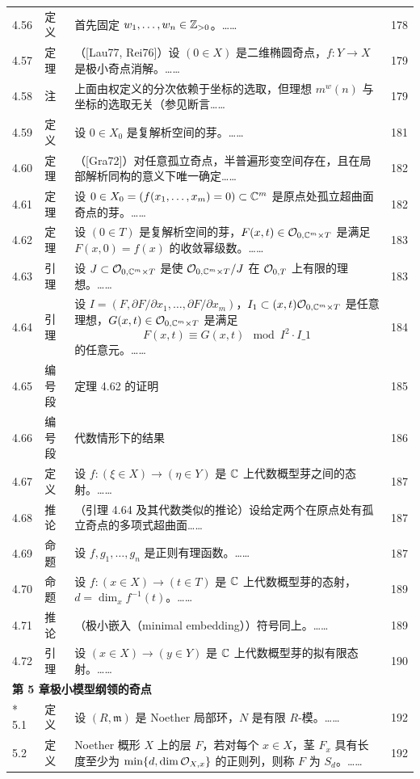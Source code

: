 \begin{longtable}{@{}p{}p{}p{}p{}@{}}
4.56 & 定义 & 首先固定 $w_1,\dots,w_n\in\mathbb{Z}_{>0}$。…… & 178 \\
4.57 & 定理 & （[Lau77, Rei76]）设 $(0\in X)$ 是二维椭圆奇点，$f:Y\to X$ 是极小奇点消解。…… & 179 \\
4.58 & 注 & 上面由权定义的分次依赖于坐标的选取，但理想 $m^w(n)$ 与坐标的选取无关（参见断言…… & 179 \\
4.59 & 定义 & 设 $0\in X_0$ 是复解析空间的芽。…… & 181 \\
4.60 & 定理 & （[Gra72]）对任意孤立奇点，半普遍形变空间存在，且在局部解析同构的意义下唯一确定…… & 182 \\
4.61 & 定理 & 设 $0\in X_0=(f(x_1,\dots,x_m)=0)\subset\mathbb{C}^m$ 是原点处孤立超曲面奇点的芽。…… & 182 \\
4.62 & 定理 & 设 $(0\in T)$ 是复解析空间的芽，$F(x,t)\in\mathcal{O}_{0,\mathbb{C}^m\times T}$ 是满足 $F(x,0)=f(x)$ 的收敛幂级数。…… & 183 \\
4.63 & 引理 & 设 $J\subset\mathcal{O}_{0,\mathbb{C}^m\times T}$ 是使 $\mathcal{O}_{0,\mathbb{C}^m\times T}/J$ 在 $\mathcal{O}_{0,T}$ 上有限的理想。…… & 183 \\
4.64 & 引理 & 设 $I=(F,\partial F/\partial x_1,\dots,\partial F/\partial x_m)$，$I_1\subset(x,t)\mathcal{O}_{0,\mathbb{C}^m\times T}$ 是任意理想，$G(x,t)\in\mathcal{O}_{0,\mathbb{C}^m\times T}$ 是满足 \[ F(x,t)\equiv G(x,t)\mod I^2\cdot I\_1 \] 的任意元。…… & 184 \\
4.65 & 编号段 & 定理 4.62 的证明 & 185 \\
4.66 & 编号段 & 代数情形下的结果 & 186 \\
4.67 & 定义 & 设 $f:(\xi\in X)\to(\eta\in Y)$ 是 $\mathbb{C}$ 上代数概型芽之间的态射。…… & 187 \\
4.68 & 推论 & （引理 4.64 及其代数类似的推论）设给定两个在原点处有孤立奇点的多项式超曲面…… & 187 \\
4.69 & 命题 & 设 $f,g_1,\dots,g_n$ 是正则有理函数。…… & 187 \\
4.70 & 命题 & 设 $f:(x\in X)\to(t\in T)$ 是 $\mathbb{C}$ 上代数概型芽的态射，$d=\dim_xf^{-1}(t)$。…… & 189 \\
4.71 & 推论 & （极小嵌入（minimal embedding））符号同上。…… & 189 \\
4.72 & 引理 & 设 $(x\in X)\to(y\in Y)$ 是 $\mathbb{C}$ 上代数概型芽的拟有限态射。…… & 190 \\
\multicolumn{4}{l}{\textbf{第 5 章\quad 极小模型纲领的奇点}}\\*
5.1 & 定义 & 设 $(R,\mathfrak{m})$ 是 Noether 局部环，$N$ 是有限 $R$-模。…… & 192 \\
5.2 & 定义 & Noether 概形 $X$ 上的层 $F$，若对每个 $x\in X$，茎 $F_x$ 具有长度至少为 $\min\{d,\dim\mathcal{O}_{X,x}\}$ 的正则列，则称 $F$ 为 $S_d$。…… & 192 \\

\end{longtable}
